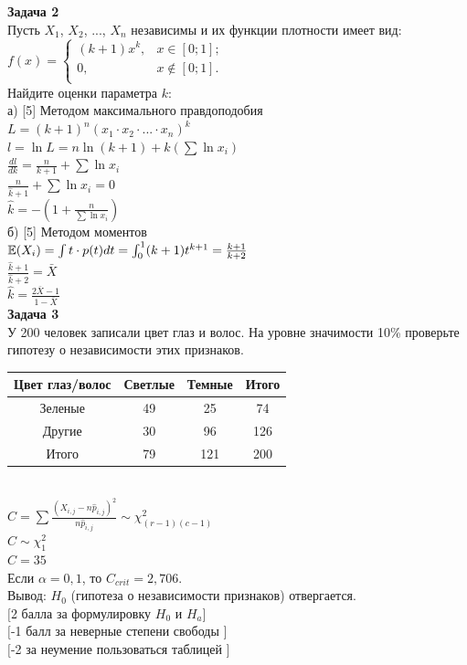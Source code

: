\documentclass[12pt, a4paper]{article}\usepackage[]{graphicx}\usepackage[]{color}
\begin{document}
	{\bf Задача 2} \\
	Пусть $X_{1}$, $X_{2}$, ..., $X_{n}$ независимы и их функции
	плотности имеет вид: \\
	$ f(x)=
	\left\{%
	\begin{array}{ll}
	(k+1)x^{k}, & x \in [0;1]; \\
	0, & x \notin [0;1]. \\
	\end{array}%
	\right.     $ \\
	Найдите оценки параметра $k$: \\
	а) [5] Методом максимального правдоподобия \\
	$L=(k+1)^{n}(x_{1}\cdot x_{2} \cdot...\cdot x_{n})^{k}$ \\
	$l=\ln{L}=n\ln(k+1)+k(\sum \ln{x_{i}})$ \\
	$\frac{dl}{dk}=\frac{n}{k+1}+\sum \ln{x_{i}}$ \\
	$\frac{n}{\hat{k}+1}+\sum \ln{x_{i}}=0$ \\
	$\hat{k}=-\left(1+\frac{n}{\sum \ln{x_{i}}} \right)$ \\
	б) [5] Методом моментов \\
	$\mathbb{E}(X_{i})=\int t\cdot p(t)dt=\int_{0}^{1}
	(k+1)t^{k+1}=\frac{k+1}{k+2}$ \\
	$\frac{\hat{k}+1}{\hat{k}+2}=\bar{X}$ \\
	$\hat{k}=\frac{2\bar{X}-1}{1-\bar{X}}$ \\


	{\bf Задача 3} \\
	У 200 человек записали цвет глаз и волос. На уровне значимости
	10\% проверьте гипотезу о независимости этих признаков. \\
	\begin{tabular}{|c|c|c|c|}
		\hline
		Цвет глаз/волос & Светлые & Темные & Итого \\
		\hline
		Зеленые & 49 & 25 & 74 \\
		Другие & 30 & 96 & 126 \\
		\hline
		Итого & 79 & 121 & 200 \\
		\hline
	\end{tabular} \\
	$C=\sum \frac{(X_{i,j}-n \hat{p}_{i,j})^{2}}{n\hat{p}_{i,j}}\sim
	\chi_{(r-1)(c-1)}^{2}$ \\
	$C\sim \chi_{1}^{2}$ \\
	$C=35$ \\
	Если $\alpha=0,1$, то $C_{crit}=2,706$. \\
	Вывод: $H_{0}$ (гипотеза о независимости признаков) отвергается. \\
	$[$2 балла за формулировку $H_{0}$ и $H_{a}]$ \\
	$[$-1 балл за неверные степени свободы $]$ \\
	$[$-2 за неумение пользоваться таблицей $]$ \\
\end{document}
